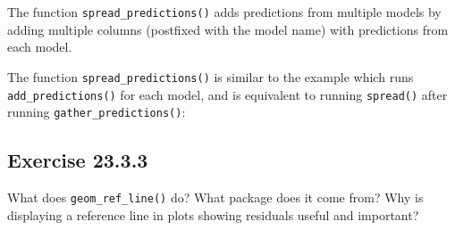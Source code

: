 \documentclass[]{book}
\newenvironment{Shaded}{\begin{snugshade}}{\end{snugshade}}
\newcommand{\CommentTok}[1]{\textcolor[rgb]{0.56,0.35,0.01}{\textit{#1}}}
\newcommand{\KeywordTok}[1]{\textcolor[rgb]{0.13,0.29,0.53}{\textbf{#1}}}
\newcommand{\NormalTok}[1]{#1}
\newcommand{\OperatorTok}[1]{\textcolor[rgb]{0.81,0.36,0.00}{\textbf{#1}}}
\newcommand{\StringTok}[1]{\textcolor[rgb]{0.31,0.60,0.02}{#1}}
\theoremstyle{plain}
\theoremstyle{remark}
\begin{document}
The function \texttt{spread\_predictions()} adds predictions from
multiple models by adding multiple columns (postfixed with the model
name) with predictions from each model.

\begin{Shaded}
\end{Shaded}

The function \texttt{spread\_predictions()} is similar to the example
which runs \texttt{add\_predictions()} for each model, and is equivalent
to running \texttt{spread()} after running
\texttt{gather\_predictions()}:

\begin{Shaded}
\end{Shaded}

\hypertarget{exercise-23.3.3}{%
\subsection*{\texorpdfstring{Exercise
{23.3.3}}{Exercise 23.3.3}}\label{exercise-23.3.3}}

What does \texttt{geom\_ref\_line()} do? What package does it come from?
Why is displaying a reference line in plots showing residuals useful and
important?
\end{document}
